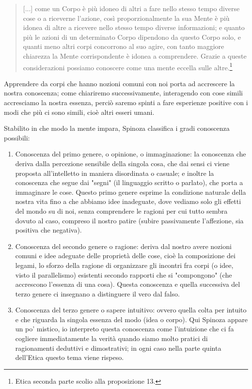 \begin{quotation}
	\small [...] come un Corpo è più idoneo di altri a fare nello stesso tempo diverse cose o a riceverne l’azione, così proporzionalmente la sua Mente è più idonea di altre a ricevere nello stesso tempo diverse informazioni; e quanto più le azioni di un determinato Corpo dipendono da questo Corpo
	solo, e quanti meno altri corpi concorrono al suo agire, con tanto maggiore chiarezza la
	Mente corrispondente è idonea a comprendere. Grazie a queste considerazioni possiamo
	conoscere come una mente eccella sulle altre.\footnote{Etica seconda parte scolio alla proposizione 13.}
\end{quotation}

Apprendere da corpi che hanno nozioni comuni con noi porta ad accrescere la nostra conoscenza; come chiariremo successivamente, interagendo con cose simili accresciamo la nostra essenza, perciò saremo spinti a fare esperienze positive con i modi che più ci sono simili, cioè altri esseri umani.

Stabilito in che modo la mente impara, Spinoza classifica i gradi conoscenza possibili:
\begin{enumerate}
	\item Conoscenza del primo genere, o opinione, o immaginazione: la conoscenza che deriva dalla percezione sensibile della singola cosa, che dai sensi ci viene proposta all’intelletto in maniera disordinata o casuale; e inoltre la conoscenza che segue dai "segni" (il linguaggio scritto o parlato), che porta a immaginare le cose. Questo primo genere esprime la condizione naturale della nostra vita fino a che abbiamo idee inadeguate, dove vediamo solo gli effetti del mondo su di noi, senza comprendere le ragioni per cui tutto sembra dovuto al caso, compreso il nostro patire (subire passivamente l'affezione, sia positiva che negativa).
	\item Conoscenza del secondo genere o ragione: deriva dal nostro avere nozioni comuni e idee adeguate delle proprietà delle cose, cioè la composizione dei legami, lo sforzo della ragione di organizzare gli incontri fra corpi (o idee, visto il parallelismo) esistenti secondo rapporti che si "compongono" (che accrescono l'essenza di una cosa). Questa conoscenza e quella successiva del terzo genere ci insegnano a distinguere il vero dal falso.
	\item Conoscenza del terzo genere o sapere intuitivo: ovvero quella colta per intuito e che riguarda la singola essenza del modo (idea o corpo). Qui Spinoza appare un po' mistico, io interpreto questa conoscenza come l'intuizione che ci fa cogliere immediatamente la verità quando siamo molto pratici di ragionamenti deduttivi e dimostrativi; in ogni caso nella parte quinta dell'Etica questo tema viene rispeso.
\end{enumerate}

